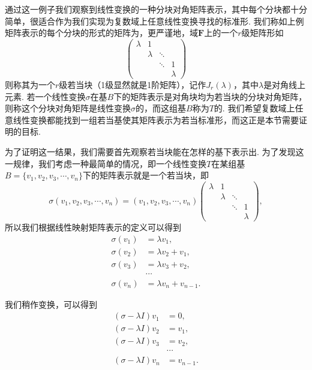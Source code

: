 通过这一例子我们观察到线性变换的一种分块对角矩阵表示，其中每个分块都十分简单，很适合作为我们实现为复数域上任意线性变换寻找的标准形. 我们称如上例矩阵表示的每个分块的形式的矩阵为，更严谨地，域$\mathbf{F}$上的一个$r$级矩阵形如\[\begin{pmatrix}
        \lambda & 1       &        &         \\
                & \lambda & \ddots &         \\
                &         & \ddots & 1       \\
                &         &        & \lambda
    \end{pmatrix}\]
则称其为一个$r$级若当块（1级显然就是1阶矩阵），记作$J_r(\lambda)$，其中$\lambda$是对角线上元素. 若一个线性变换$\sigma$在基$B$下的矩阵表示是对角块均为若当块的分块对角矩阵，则称这个分块对角矩阵是线性变换$\sigma$的，而这组基$B$称为$T$的. 我们希望复数域上任意线性变换都能找到一组若当基使其矩阵表示为若当标准形，而这正是本节需要证明的目标.

为了证明这一结果，我们需要首先观察若当块能在怎样的基下表示出. 为了发现这一规律，我们考虑一种最简单的情况，即一个线性变换$T$在某组基$B=\{v_1,v_2,v_3,\cdots,v_n\}$下的矩阵表示就是一个若当块，即
\[\sigma(v_1,v_2,v_3,\cdots,v_n)=(v_1,v_2,v_3,\cdots,v_n)\begin{pmatrix}
        \lambda & 1       &        &         \\
                & \lambda & \ddots &         \\
                &         & \ddots & 1       \\
                &         &        & \lambda
    \end{pmatrix},\]
所以我们根据线性映射矩阵表示的定义可以得到
\begin{align*}
    \sigma(v_1) & =\lambda v_1,         \\
    \sigma(v_2) & =\lambda v_2+v_1,     \\
    \sigma(v_3) & =\lambda v_3+v_2,     \\
                & \cdots                \\
    \sigma(v_n) & =\lambda v_n+v_{n-1}.
\end{align*}

我们稍作变换，可以得到
\begin{equation} \label{eq:17:若当基的推导}
    \begin{aligned}
        (\sigma-\lambda I)v_1 & =0,       \\
        (\sigma-\lambda I)v_2 & =v_1,     \\
        (\sigma-\lambda I)v_3 & =v_2,     \\
                              & \cdots    \\
        (\sigma-\lambda I)v_n & =v_{n-1}.
    \end{aligned}
\end{equation}

